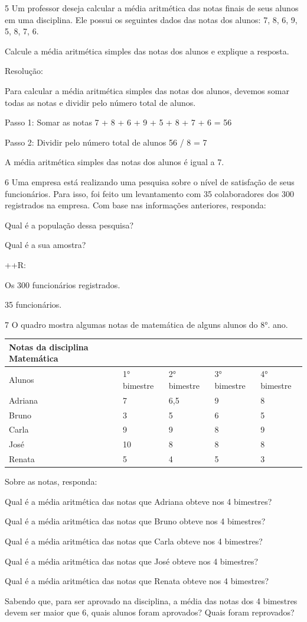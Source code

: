 {\num{5} Um professor deseja calcular a média aritmética das notas finais de
seus alunos em uma disciplina. Ele possui os seguintes dados das notas
dos alunos: 7, 8, 6, 9, 5, 8, 7, 6.

Calcule a média aritmética simples das notas dos alunos e explique a
resposta.

Resolução:

Para calcular a média aritmética simples das notas dos alunos, devemos
somar todas as notas e dividir pelo número total de alunos.

Passo 1: Somar as notas 7 + 8 + 6 + 9 + 5 + 8 + 7 + 6 = 56

Passo 2: Dividir pelo número total de alunos 56 / 8 = 7

A média aritmética simples das notas dos alunos é igual a 7.

\num{6} Uma empresa está realizando uma pesquisa sobre o nível de satisfação
de seus funcionários. Para isso, foi feito um levantamento com 35
colaboradores dos 300 registrados na empresa. Com base nas informações
anteriores, responda:
\item Qual é a população dessa pesquisa?
\item Qual é a sua amostra?

++R:
\item Os 300 funcionários registrados.
\item 35 funcionários.

\num{7} O quadro mostra algumas notas de matemática de alguns alunos do 8°.
ano.


\begin{longtable}[]{@{}lllll@{}}
\toprule
Notas da disciplina Matemática & & & &\tabularnewline
\midrule
\endhead
Alunos & 1° bimestre & 2° bimestre & 3° bimestre & 4°
bimestre\tabularnewline
Adriana & 7 & 6,5 & 9 & 8\tabularnewline
Bruno & 3 & 5 & 6 & 5\tabularnewline
Carla & 9 & 9 & 8 & 9\tabularnewline
José & 10 & 8 & 8 & 8\tabularnewline
Renata & 5 & 4 & 5 & 3\tabularnewline
\bottomrule
\end{longtable}

Sobre as notas, responda:
\item Qual é a média aritmética das notas que Adriana obteve nos 4
bimestres?
\item Qual é a média aritmética das notas que Bruno obteve nos 4 bimestres?
\item Qual é a média aritmética das notas que Carla obteve nos 4 bimestres?
\item Qual é a média aritmética das notas que José obteve nos 4 bimestres?
\item Qual é a média aritmética das notas que Renata obteve nos 4
bimestres?
\item Sabendo que, para ser aprovado na disciplina, a média das notas dos 4
bimestres devem ser maior que 6, quais alunos foram aprovados? Quais
foram reprovados?

}

